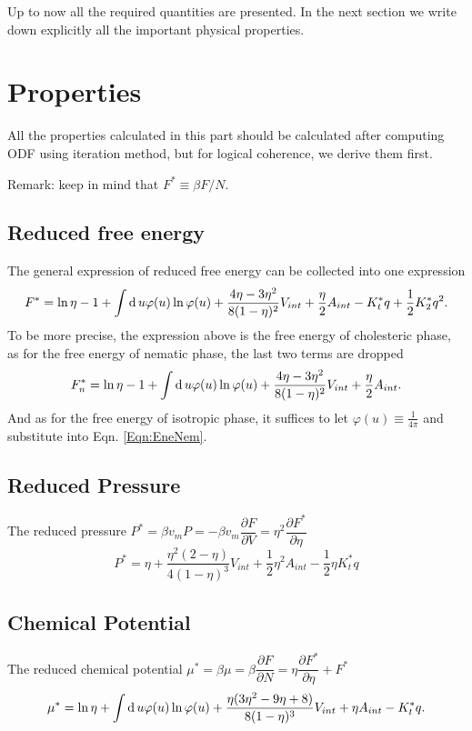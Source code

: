Up to now all the required quantities are presented. In the next section we write down explicitly all the important physical properties.

\section{Properties}
All the properties calculated in this part should be calculated after computing ODF using iteration method, but for logical coherence, we derive them first.

Remark: keep in mind that $F^*\equiv\beta F/N$.
\subsection{Reduced free energy}
The general expression of reduced free energy can be collected into one expression
\begin{equation}\label{Eqn:FreeEne}
	F^*=\ln\eta -1+\int\operatorname{d}u\varphi(u)\ln \varphi(u)+\frac{4\eta-3\eta^2}{8(1-\eta)^2}V_{int}+\frac{\eta}{2}A_{int}-K_t^*q+\frac{1}{2}K_2^*q^2.
\end{equation}
To be more precise, the expression above is the free energy of cholesteric phase, as for the free energy of nematic phase, the last two terms are dropped
\begin{equation}\label{Eqn:EneNem}
	F_{n}^*=\ln\eta -1+\int\operatorname{d}u\varphi(u)\ln \varphi(u)+\frac{4\eta-3\eta^2}{8(1-\eta)^2}V_{int}+\frac{\eta}{2}A_{int}.
\end{equation}
And as for the free energy of isotropic phase, it suffices to let $\varphi(u)\equiv \frac{1}{4\pi}$ and substitute into Eqn. \ref{Eqn:EneNem}.

\subsection{Reduced Pressure}
The reduced pressure $P^*=\beta v_m P=-\beta v_m \dfrac{\partial F}{\partial V}= \eta^2\dfrac{\partial F^*}{\partial\eta}$
\begin{equation}\label{Eqn:Press}
	P^* = \eta + \frac{\eta^2(2-\eta)}{4(1-\eta)^3}V_{int}+\frac{1}{2}\eta^2A_{int}-\frac{1}{2}\eta K_t^*q
\end{equation}

\subsection{Chemical Potential}
The reduced chemical potential $\mu^*=\beta\mu=\beta\dfrac{\partial F}{\partial N}=\eta\dfrac{\partial F^*}{\partial\eta}+F^*$
\begin{equation}\label{Eqn:ChemPot}
	\mu^*=\ln\eta+\int\operatorname{d}u\varphi(u)\ln \varphi(u)+\frac{\eta(3\eta^2-9\eta+8)}{8(1-\eta)^3}V_{int}+\eta A_{int}-K_t^*q.
\end{equation}

